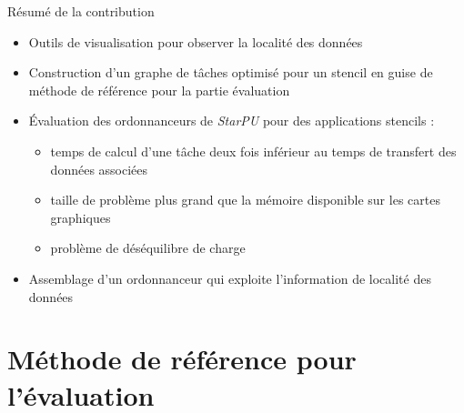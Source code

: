 \documentclass[9pt]{beamer}
\begin{document}
\begin{frame}{\textcolor{inriaGrey}{Résumé de la contribution}}
  \vfill
  \begin{itemize}
  \item<1-> Outils de visualisation pour observer la localité des données
    \vfill
  \item<2-> Construction d'un graphe de tâches optimisé pour un stencil en guise
    de méthode de référence pour la partie évaluation \vfill
  \item<3-> Évaluation des ordonnanceurs de \textit{StarPU} pour des applications
    stencils :
    \vfill
    \begin{itemize}
    \item<4-> temps de calcul d'une tâche deux fois inférieur au temps de
      transfert des données associées \vfill
    \item<5-> taille de problème plus grand que la mémoire disponible sur les
      cartes graphiques \vfill
    \item<6-> problème de déséquilibre de charge
    \end{itemize}
    \vfill
  \item<7-> Assemblage d'un ordonnanceur qui exploite l'information de localité
    des données
  \end{itemize}
  \vfill
\end{frame}

\section{Méthode de référence pour l'évaluation}
\end{document}
